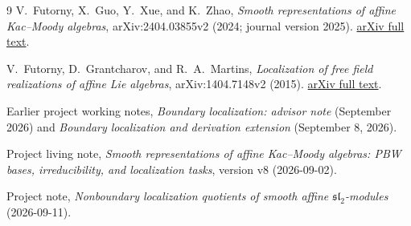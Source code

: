 \documentclass[11pt,a4paper]{article}
\theoremstyle{plainupright}
\begin{document}
\begingroup
\raggedright
\begin{thebibliography}{9}
V.~Futorny, X.~Guo, Y.~Xue, and K.~Zhao,
\emph{Smooth representations of affine Kac--Moody algebras},
arXiv:2404.03855v2 (2024; journal version 2025).
\href{https://arxiv.org/html/2404.03855v2}{arXiv full text}.

V.~Futorny, D.~Grantcharov, and R.~A.~Martins,
\emph{Localization of free field realizations of affine Lie algebras},
arXiv:1404.7148v2 (2015).
\href{https://arxiv.org/html/1404.7148v2}{arXiv full text}.

Earlier project working notes, \emph{Boundary localization: advisor note}
(September 2026) and \emph{Boundary localization and derivation extension}
(September 8, 2026).

Project living note, \emph{Smooth representations of affine Kac--Moody
algebras: PBW bases, irreducibility, and localization tasks},
version v8 (2026-09-02).

Project note, \emph{Nonboundary localization quotients of smooth affine
\(\mathfrak{sl}_2\)-modules} (2026-09-11).
\end{thebibliography}
\endgroup
\end{document}
